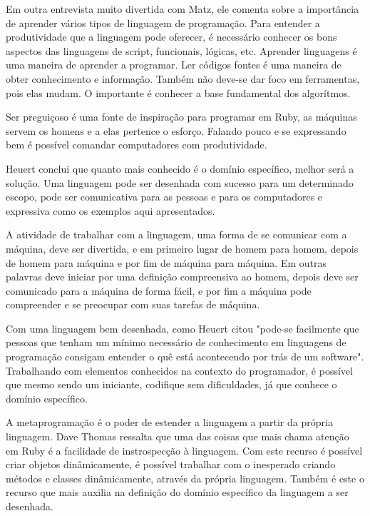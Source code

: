 \documentclass[espaco=simples,appendix=Name]{abnt}
\begin{document}
Em outra entrevista muito divertida \cite{entrevistaDivertidaComMatz} com Matz, ele comenta sobre a importância de aprender vários tipos de linguagem de programação. Para entender a produtividade que a linguagem pode oferecer, é necessário conhecer os bons aspectos das linguagens de script, funcionais, lógicas, etc. Aprender linguagens é uma maneira de aprender a programar. Ler códigos fontes é uma maneira de obter conhecimento e informação. Também não deve-se dar foco em ferramentas, pois elas mudam. O importante é conhecer a base fundamental dos algorítmos.

Ser preguiçoso é uma fonte de inspiração para programar em Ruby, as máquinas servem os homens e a elas pertence o esforço. Falando pouco e se expressando bem é possível comandar computadores com produtividade.

Heuert\cite{dslLeandro} conclui que quanto mais conhecido é o domínio específico, melhor será a solução. Uma linguagem pode ser desenhada com sucesso para um determinado escopo, pode ser comunicativa para as pessoas e para os computadores e expressiva como os exemplos aqui apresentados.

A atividade de trabalhar com a linguagem, uma forma de se comunicar com a máquina, deve ser divertida, e em primeiro lugar de homem para homem, depois de homem para máquina e por fim de máquina para máquina\cite{entrevistaDivertidaComMatz}. Em outras palavras deve iniciar por uma definição compreensiva ao homem, depois deve ser comunicado para a máquina de forma fácil, e por fim a máquina pode compreender e se preocupar com suas tarefas de máquina.


Com uma linguagem bem desenhada, como Heuert citou "pode-se facilmente que pessoas que tenham um mínimo necessário de conhecimento em linguagens de programação consigam entender o quê está acontecendo por trás de um software"\cite{dslLeandro}. Trabalhando com elementos conhecidos na contexto do programador, é possível que mesmo sendo um iniciante, codifique sem dificuldades, já que conhece o domínio específico.

A metaprogramação é o poder de estender a linguagem a partir da própria linguagem. Dave Thomas\cite{programmingRuby} ressalta que uma das coisas que mais chama atenção em Ruby é a facilidade de instrospecção à linguagem. Com este recurso é possível criar objetos dinâmicamente, é possível trabalhar com o inesperado criando métodos e classes dinâmicamente, através da própria linguagem. Também é este o recurso que mais auxilia na definição do domínio específico da linguagem a ser desenhada. 
\end{document}
